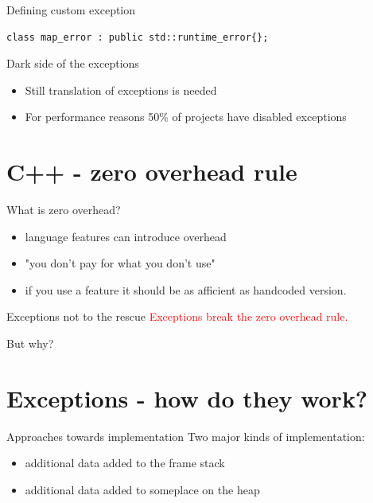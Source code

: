 \documentclass[10pt]{beamer}
\begin{document}
\begin{frame}[fragile]{Defining custom exception}
	\begin{verbatim}
class map_error : public std::runtime_error{};
	\end{verbatim}
\end{frame}

\begin{frame}[fragile]{Dark side of the exceptions}
	\begin{itemize}[<+- | alert@+>]
		\item Still translation of exceptions is needed
		\item For performance reasons 50\% of projects have disabled exceptions
	\end{itemize}
\end{frame}

\section{C++ - zero overhead rule}

\begin{frame}{What is zero overhead?}
	\begin{itemize}[<+- | alert@+>]
		\item language features {\color{amethyst}can} introduce overhead
		\item "you don't pay for what you don't use"
		\item if you use a feature it should be as afficient as handcoded version.
	\end{itemize}
\end{frame}

\begin{frame}{Exceptions not to the rescue}
		\centering
		\textcolor{red}{Exceptions break the zero overhead rule.}
		
		But why?
\end{frame}

\section{Exceptions - how do they work?}

\begin{frame}{Approaches towards implementation}
	Two major kinds of implementation:
	\begin{itemize}[<+- | alert@+>]
		\item additional data added to the frame stack
		\item additional data added to someplace on the heap
	\end{itemize}
\end{frame}
	
\end{document}
